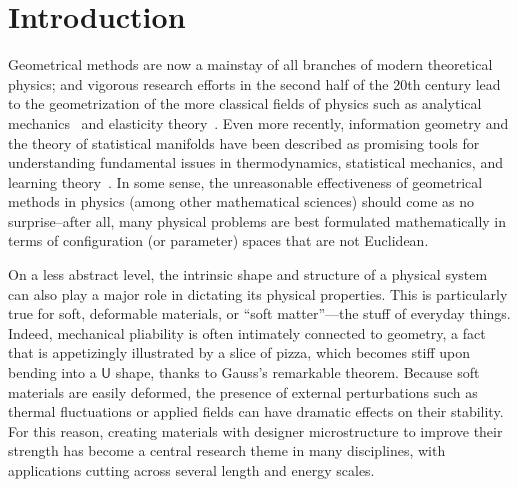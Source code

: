 
\chapter{Introduction}


Geometrical methods are now a mainstay of all branches of modern theoretical physics;
and vigorous research efforts in the second half of the 20th century lead to the geometrization of the more classical fields of physics such as analytical mechanics~\cite{sudarshan1974,arnold1978,souder2017} and elasticity theory~\cite{marsden1994,audoly2010}.
Even more recently, information geometry and the theory of statistical manifolds have been described as promising tools for understanding fundamental issues in thermodynamics, statistical mechanics, and learning theory~\cite{ruppeiner1995}.
In some sense, the unreasonable effectiveness of geometrical methods in physics (among other mathematical sciences) should come as no surprise--after all, many physical problems are best formulated mathematically in terms of configuration (or parameter) spaces that are not Euclidean.

On a less abstract level, the intrinsic shape and structure of a physical system can also play a major role in dictating its physical properties.
This is particularly true for soft, deformable materials, or ``soft matter''---the stuff of everyday things.
Indeed, mechanical pliability is often intimately connected to geometry, a fact that is appetizingly illustrated by a slice of pizza, which becomes stiff upon bending into a $\textsf{U}$ shape, thanks to Gauss's remarkable theorem.
Because soft materials are easily deformed, the presence of external perturbations such as thermal fluctuations or applied fields can have dramatic effects on their stability.
For this reason, creating materials with designer microstructure to improve their strength has become a central research theme in many disciplines, with applications cutting across several length and energy scales.

